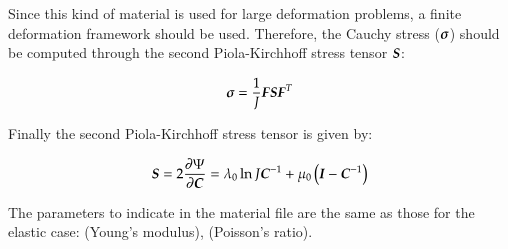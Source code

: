 Since this kind of material is used for large deformation problems, a
finite deformation framework should be used. Therefore, the Cauchy
stress ($\boldsymbol{\sigma}$) should be computed through the second
Piola-Kirchhoff stress tensor $\boldsymbol{S}$:

\begin{equation}
  \boldsymbol{\sigma } = \frac{1}{J}\boldsymbol{F}\boldsymbol{S}\boldsymbol{F}^T
\end{equation}

Finally the second Piola-Kirchhoff stress tensor is given by:

\begin{equation}
  \boldsymbol{S}  = 2\frac{\partial\Psi}{\partial\boldsymbol{C}} = \lambda_0\ln J
  \boldsymbol{C}^{-1}+\mu_0\left(\boldsymbol{I}-\boldsymbol{C}^{-1}\right)
\end{equation}

The parameters to indicate in the material file are the same
as those for the elastic case:  (Young's modulus),  (Poisson's
ratio).


